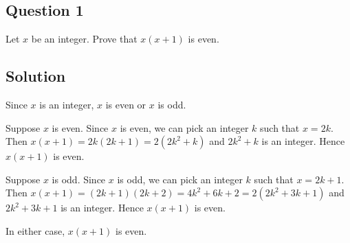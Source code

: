 \documentclass{article}
\begin{document}
\subsection*{Question 1}
    Let $x$ be an integer. Prove that $x(x + 1)$ is even.

\subsection*{Solution}
    Since $x$ is an integer, $x$ is even or $x$ is odd.

    \begin{Cases}
        \item Suppose $x$ is even. Since $x$ is even, we can pick an integer $k$ such that $x = 2k$. Then $x(x + 1) = 2k(2k + 1) = 2(2k^2 + k)$ and $2k^2 + k$ is an integer. Hence $x(x + 1)$ is even.
        \item Suppose $x$ is odd. Since $x$ is odd, we can pick an integer $k$ such that $x = 2k + 1$. Then $x(x + 1) = (2k + 1)(2k + 2) = 4k^2 + 6k + 2 = 2(2k^2 + 3k + 1)$ and $2k^2 + 3k + 1$ is an integer. Hence $x(x + 1)$ is even.
    \end{Cases}
    In either case, $x(x + 1)$ is even.
\end{document}

